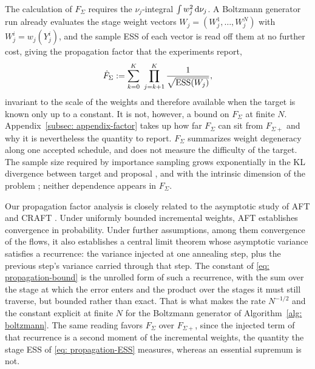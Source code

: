 \documentclass{article}
\begin{document}
{\color{blue}The calculation of $F_\Sigma$ requires the $\nu_j$-integral $\int w_j^2 \, \mathrm{d}\nu_j$. A Boltzmann generator run already evaluates the stage weight vectors $W_j = (W_j^1,\dots,W_j^N)$ with $W_j^i = w_j(Y_j^i)$, and the sample ESS of each vector is read off them at no further cost, giving the propagation factor that the experiments report,}
\begin{equation}
    \hat F_{\Sigma} := \sum_{k=0}^{K}\ \prod_{j=k+1}^{K} \frac{1}{\sqrt{\ESS(W_j)}} ,
    \label{eq: propagation-factor-hat}
\end{equation}
invariant to the scale of the weights and therefore available when the target is known only up to a constant. {\color{blue}It is not, however, a bound on $F_\Sigma$ at finite $N$. Appendix~\ref{subsec: appendix-factor} takes up how far $F_\Sigma$ can sit from $F_{\Sigma+}$ and why it is nevertheless the quantity to report.}
{\color{blue}$F_\Sigma$} summarizes weight degeneracy along one accepted schedule, and does not measure the difficulty of the target. The sample size required by importance sampling grows exponentially in the KL divergence between target and proposal \citep{chatterjee2018sample}, and with the intrinsic dimension of the problem \citep{agapiou2017importance}; neither dependence appears in $F_\Sigma$.

Our propagation factor analysis is closely related to the asymptotic study of AFT \citep{arbel2021annealed} and CRAFT \citep{matthews2022craft}. Under uniformly bounded incremental weights, AFT establishes convergence in probability. Under further assumptions, among them convergence of the flows, it also establishes a central limit theorem whose asymptotic variance satisfies a recurrence: the variance injected at one annealing step, plus the previous step's variance carried through that step. The constant of \eqref{eq: propagation-bound} is the unrolled form of such a recurrence, with the sum over the stage at which the error enters and the product over the stages it must still traverse, but bounded rather than exact. That is what makes the rate $N^{-1/2}$ and the constant explicit at finite $N$ for the Boltzmann generator of Algorithm~\ref{alg: boltzmann}. The same reading favors $F_\Sigma$ over $F_{\Sigma+}$, since the injected term of that recurrence is a second moment of the incremental weights, the quantity the stage ESS of \eqref{eq: propagation-ESS} measures, whereas an essential supremum is not.

%
%
\end{document}
